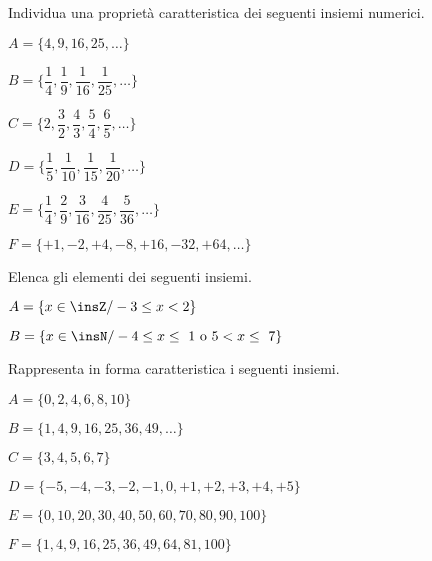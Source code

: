 \begin{esercizio}
Individua una proprietà caratteristica dei seguenti insiemi numerici.
\label{ese:6.18}
\begin{multicols}{2}
\begin{enumeratea}
\spazielenx
 \item $A=\{4,9,16,25,\ldots\}$
 \item 
$B=\bigg\{\dfrac{1}{4},\dfrac{1}{9},\dfrac{1}{16},\dfrac{1}{25},\ldots\bigg\}$
 \item 
$C=\bigg\{2,\dfrac{3}{2},\dfrac{4}{3},\dfrac{5}{4},\dfrac{6}{5},\ldots\bigg\}$
 \item 
$D=\bigg\{\dfrac{1}{5},\dfrac{1}{10},\dfrac{1}{15},\dfrac{1}{20},\ldots\bigg\}$
 \item 
$E=\bigg\{\dfrac{1}{4},\dfrac{2}{9},\dfrac{3}{16},\dfrac{4}{25},\dfrac{5}{36},
\ldots\bigg\}$
 \item $F=\{+1, -2, +4, -8, +16, -32, +64, \ldots\}$
 \end{enumeratea}
\end{multicols}
\end{esercizio}

\begin{esercizio}
\label{ese:6.19}
Elenca gli elementi dei seguenti insiemi.
\begin{multicols}{2}
\begin{enumeratea}
\item $A=\{x\in\insZ/-3\le x<2\}$
\item $B=\{x\in\insN/-4\le x\le~1\text{ o }5<x\le~7\}$
\end{enumeratea}
\end{multicols}
\end{esercizio}

\begin{esercizio}
\label{ese:6.20}
Rappresenta in forma caratteristica i seguenti insiemi.
\begin{enumeratea}
\item $A=\{0, 2, 4, 6, 8, 10\}$
\item $B=\{1, 4, 9, 16, 25, 36,49, \ldots\}$
\item $C=\{3, 4, 5, 6, 7\}$
\item $D=\{-5, -4, -3, -2, -1, 0, +1, +2, +3, +4, +5\}$
\item $E=\{0, 10, 20, 30, 40, 50, 60, 70, 80, 90, 100\}$
\item $F=\{1, 4, 9, 16, 25, 36, 49, 64, 81, 100\}$
\end{enumeratea}
\end{esercizio}

